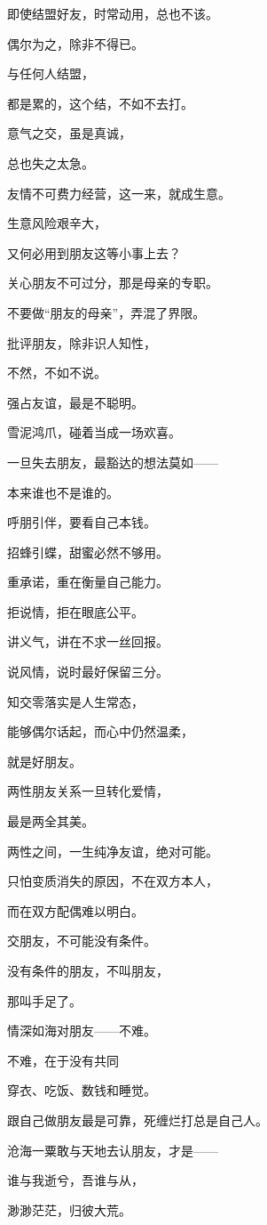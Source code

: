 \par 
\par 即使结盟好友，时常动用，总也不该。
\par 偶尔为之，除非不得已。
\par 与任何人结盟，
\par 都是累的，这个结，不如不去打。
\par 
\par 意气之交，虽是真诚，
\par 总也失之太急。
\par 
\par 友情不可费力经营，这一来，就成生意。
\par 生意风险艰辛大，
\par 又何必用到朋友这等小事上去？
\par 关心朋友不可过分，那是母亲的专职。
\par 不要做“朋友的母亲”，弄混了界限。
\par 
\par 批评朋友，除非识人知性，
\par 不然，不如不说。
\par 
\par 强占友谊，最是不聪明。
\par 雪泥鸿爪，碰着当成一场欢喜。
\par 一旦失去朋友，最豁达的想法莫如——
\par 本来谁也不是谁的。
\par 
\par 呼朋引伴，要看自己本钱。
\par 招蜂引蝶，甜蜜必然不够用。
\par 重承诺，重在衡量自己能力。
\par 拒说情，拒在眼底公平。
\par 讲义气，讲在不求一丝回报。
\par 说风情，说时最好保留三分。
\par 
\par 知交零落实是人生常态，
\par 能够偶尔话起，而心中仍然温柔，
\par 就是好朋友。
\par 
\par 两性朋友关系一旦转化爱情，
\par 最是两全其美。
\par 两性之间，一生纯净友谊，绝对可能。
\par 只怕变质消失的原因，不在双方本人，
\par 而在双方配偶难以明白。
\par 
\par 交朋友，不可能没有条件。
\par 没有条件的朋友，不叫朋友，
\par 那叫手足了。
\par 
\par 情深如海对朋友——不难。
\par 不难，在于没有共同
\par 穿衣、吃饭、数钱和睡觉。
\par 跟自己做朋友最是可靠，死缠烂打总是自己人。
\par 
\par 沧海一粟敢与天地去认朋友，才是——
\par 谁与我逝兮，吾谁与从，
\par 渺渺茫茫，归彼大荒。








